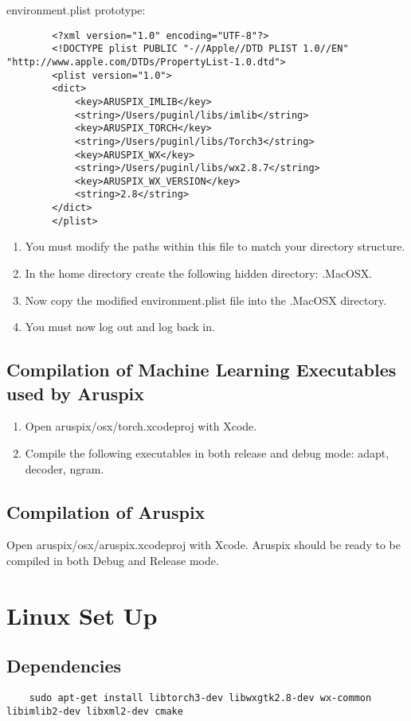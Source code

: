 \documentclass[]{article}
\begin{document}
	environment.plist prototype:
	\begin{verbatim}
		<?xml version="1.0" encoding="UTF-8"?>
		<!DOCTYPE plist PUBLIC "-//Apple//DTD PLIST 1.0//EN" "http://www.apple.com/DTDs/PropertyList-1.0.dtd">
		<plist version="1.0">
		<dict>
		    <key>ARUSPIX_IMLIB</key>
		    <string>/Users/puginl/libs/imlib</string>
		    <key>ARUSPIX_TORCH</key>
		    <string>/Users/puginl/libs/Torch3</string>
		    <key>ARUSPIX_WX</key>
		    <string>/Users/puginl/libs/wx2.8.7</string>
		    <key>ARUSPIX_WX_VERSION</key>
		    <string>2.8</string>
		</dict>
		</plist>
	\end{verbatim}
	\begin{enumerate}
		\item You must modify the paths within this file to match your directory structure.
		\item In the home directory create the following hidden directory: .MacOSX.
		\item Now copy the modified environment.plist file into the .MacOSX directory.
		\item You must now log out and log back in.
	\end{enumerate}
	
\subsection{Compilation of Machine Learning Executables used by Aruspix}
	\begin{enumerate}
		\item Open aruspix/osx/torch.xcodeproj with Xcode.
		\item Compile the following executables in both release and debug mode: adapt, decoder, ngram.
	\end{enumerate}

\subsection{Compilation of Aruspix}
Open aruspix/osx/aruspix.xcodeproj with Xcode.
Aruspix should be ready to be compiled in both Debug and Release mode. 

\section{Linux Set Up}

\subsection{Dependencies}
 \begin{verbatim}
	sudo apt-get install libtorch3-dev libwxgtk2.8-dev wx-common libimlib2-dev libxml2-dev cmake
 \end{verbatim}
\end{document}
